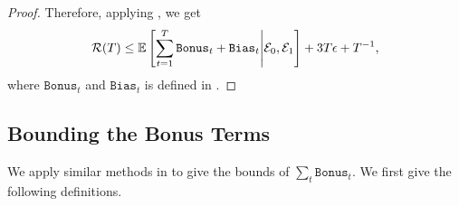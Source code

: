 \begin{lemma}
\begin{proof}
Therefore, applying , we get
\begin{align*}
    {\mathcal{R}}(T) \le \mathbb{E}\left[\sum_{t=1}^T \texttt{Bonus}_t + \texttt{Bias}_t\middle| {\mathcal{E}}_0, {\mathcal{E}}_1\right] + 3T\epsilon + T^{-1},
\end{align*}
where $\texttt{Bonus}_t$ and $\texttt{Bias}_t$ is defined in .
\end{proof}
\end{lemma}

\subsection{Bounding the Bonus Terms}

We apply similar methods in \citet{wang2017improving,liu2023contextual} to give the bounds of $\sum_t\texttt{Bonus}_t$. We first give the following definitions.

